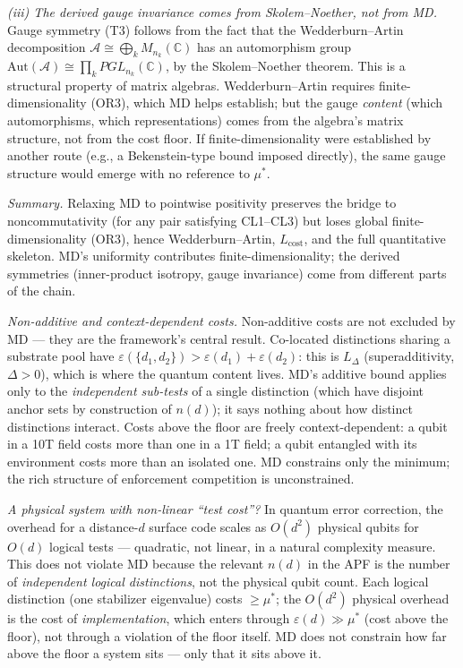\documentclass[11pt]{article}
\theoremstyle{remark}
\begin{document}
\emph{(iii) The derived gauge invariance comes from Skolem--Noether, not from MD.}  Gauge symmetry (T3) follows from the fact that the Wedderburn--Artin decomposition $\mathcal{A} \cong \bigoplus_k M_{n_k}(\mathbb{C})$ has an automorphism group $\mathrm{Aut}(\mathcal{A}) \cong \prod_k PGL_{n_k}(\mathbb{C})$, by the Skolem--Noether theorem.  This is a structural property of matrix algebras.  Wedderburn--Artin requires finite-dimensionality (OR3), which MD helps establish; but the gauge \emph{content} (which automorphisms, which representations) comes from the algebra's matrix structure, not from the cost floor.  If finite-dimensionality were established by another route (e.g., a Bekenstein-type bound imposed directly), the same gauge structure would emerge with no reference to $\mu^*$.

\emph{Summary.}  Relaxing MD to pointwise positivity preserves the bridge to noncommutativity (for any pair satisfying CL1--CL3) but loses global finite-dimensionality (OR3), hence Wedderburn--Artin, $L_{\mathrm{cost}}$, and the full quantitative skeleton.  MD's uniformity contributes finite-dimensionality; the derived symmetries (inner-product isotropy, gauge invariance) come from different parts of the chain.

\smallskip\noindent\textit{Non-additive and context-dependent costs.}  Non-additive costs are not excluded by MD --- they are the framework's central result.  Co-located distinctions sharing a substrate pool have $\varepsilon(\{d_1, d_2\}) > \varepsilon(d_1) + \varepsilon(d_2)$: this is $L_\Delta$ (superadditivity, $\Delta > 0$), which is where the quantum content lives.  MD's additive bound applies only to the \emph{independent sub-tests} of a single distinction (which have disjoint anchor sets by construction of $n(d)$); it says nothing about how distinct distinctions interact.  Costs above the floor are freely context-dependent: a qubit in a 10T field costs more than one in a 1T field; a qubit entangled with its environment costs more than an isolated one.  MD constrains only the minimum; the rich structure of enforcement competition is unconstrained.

\smallskip\noindent\textit{A physical system with non-linear ``test cost''?}  In quantum error correction, the overhead for a distance-$d$ surface code scales as $O(d^2)$ physical qubits for $O(d)$ logical tests --- quadratic, not linear, in a natural complexity measure.  This does not violate MD because the relevant $n(d)$ in the APF is the number of \emph{independent logical distinctions}, not the physical qubit count.  Each logical distinction (one stabilizer eigenvalue) costs $\ge \mu^*$; the $O(d^2)$ physical overhead is the cost of \emph{implementation}, which enters through $\varepsilon(d) \gg \mu^*$ (cost above the floor), not through a violation of the floor itself.  MD does not constrain how far above the floor a system sits --- only that it sits above it.
\end{document}

